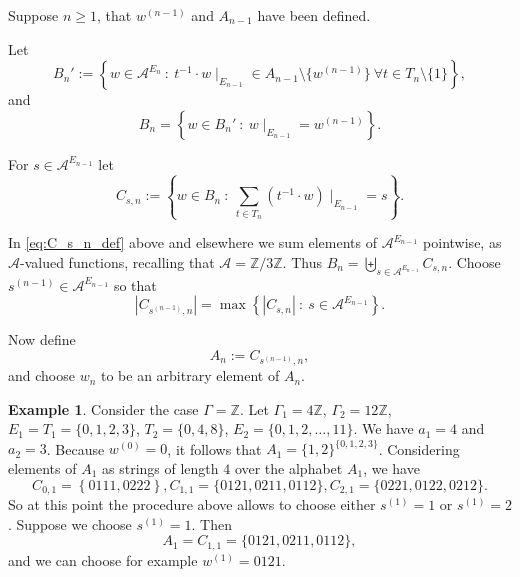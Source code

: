 \documentclass[oneside,english]{amsart}
\theoremstyle{definition}
\newtheorem{example}[thm]{Example}
\newcommand{\AAA}{\mathcal{A}}
\newcommand{\ZZ}{\mathbb{Z}}
\newcommand{\NN}{\mathbb{N}}
\newcommand{\FF}{\mathbb{F}}
\begin{document}
Suppose $n \ge 1$, that $w^{(n-1)}$ and $A_{n-1}$ have been defined.


Let
\begin{equation}
 B_n' := \left\{ w \in \AAA^{E_n} ~:~   t^{-1} \cdot  w \mid_{E_{n-1}} \in  A_{n-1} \setminus \{w^{(n-1)}\} ~ \forall t \in T_n \setminus \{1\}\right\},
\end{equation}
and
\begin{equation}
 B_n = \left\{ w \in B_n' ~:~ w \mid_{E_{n-1}} = w^{(n-1)}\right\}.
\end{equation}


For $s \in \AAA^{E_{n-1}}$ let
\begin{equation}\label{eq:C_s_n_def}
 C_{s,n} := \left\{ w \in B_n ~:~ \sum_{t \in T_n} (t^{-1} \cdot w)\mid_{E_{n-1}} = s \right\}.
\end{equation}

In \eqref{eq:C_s_n_def} above and elsewhere we sum elements of $\AAA^{E_{n-1}}$ pointwise, as $\AAA$-valued functions, recalling that $\AAA = \mathbb{Z}/3\mathbb{Z}$.
Thus $B_n = \biguplus_{s \in \AAA^{E_{n-1}}}C_{s,n}$.
Choose  $s^{(n-1)} \in \AAA^{E_{n-1}}$ so that
\begin{equation}
|C_{s^{(n-1)},n}| = \max\left\{|C_{s,n}|~:~ s \in \AAA^{E_{n-1}}\right\}.
\end{equation}

Now define
$$A_n := C_{s^{(n-1)},n},$$
and choose $w_n$ to be an arbitrary element of $A_n$.


\begin{example}
Consider the case $\Gamma = \ZZ$. Let $\Gamma_1 = 4 \ZZ$, $\Gamma_2 = 12 \ZZ$, $E_1 = T_1 = \{0,1,2,3\}$, $T_2= \{0,4,8\}$, $E_2 = \{0,1,2,\ldots,11\}$. We have
 $a_1 = 4$ and $a_2 =3$. Because $w^{(0)} = 0 $, it follows that
$A_1 = \{1,2\}^{\{0,1,2,3\}}$.
Considering elements of $A_1$ as strings of length $4$ over the alphabet $A_1$, we have
$$ C_{0,1} = \left\{ 0111, 0222\right\}, C_{1,1} = \{0121,0211,0112\}, C_{2,1}=\{0221,0122,0212\} .$$
So  at this point the procedure above allows to choose  either  $s^{(1)} =1$ or $s^{(1)}=2$. Suppose we choose $s^{(1)} =1$. Then
$$A_1= C_{1,1} = \{0121,0211,0112\},$$
and we can choose for example $w^{(1)} = 0121$.
\end{example}
\end{document}
